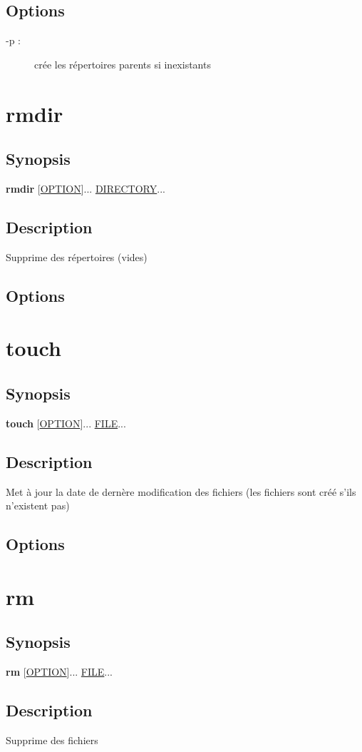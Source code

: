 \documentclass[a4paper, 10pt, onecolumn, openright, oneside]{book}
\begin{document}
			\subsection{Options}
				\begin{description}
				\item[-p :] crée les répertoires parents si inexistants
				\end{description}
		\section{rmdir}
			\subsection{Synopsis}
				\textbf{rmdir} [\ul{OPTION}]... \ul{DIRECTORY}...
			\subsection{Description}
				Supprime des répertoires (vides)
			\subsection{Options}
		\section{touch}
			\subsection{Synopsis}
				\textbf{touch} [\ul{OPTION}]... \ul{FILE}...
			\subsection{Description}
				Met à jour la date de dernère modification des fichiers (les fichiers sont créé s'ils n'existent pas)
			\subsection{Options}
		\section{rm}
			\subsection{Synopsis}
				\textbf{rm} [\ul{OPTION}]... \ul{FILE}...
			\subsection{Description}
				Supprime des fichiers
\end{document}
